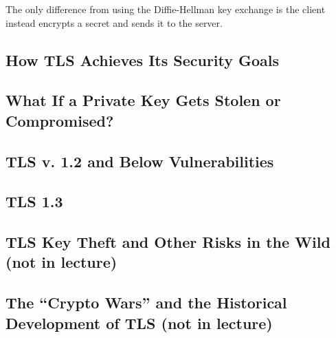 \documentclass[11pt]{article} %
\begin{document}
The only difference from using the Diffie-Hellman key exchange is the client 
instead encrypts a secret and sends it to the server.

\newpage
\subsection{How TLS Achieves Its Security Goals}

\subsection{What If a Private Key Gets Stolen or Compromised?}

\subsection{TLS v. 1.2 and Below Vulnerabilities}

\subsection{TLS 1.3}

\subsection{TLS Key Theft and Other Risks in the Wild (not in lecture)}

\subsection{The “Crypto Wars” and the Historical Development of TLS (not in lecture)}
\end{document}
